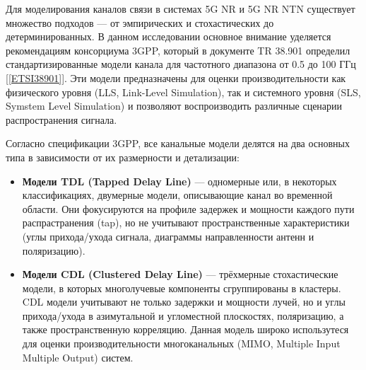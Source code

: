 %

Для моделирования каналов связи в системах 5G NR и 5G NR NTN существует множество подходов
— от эмпирических и стохастических до детерминированных.
В данном исследовании основное внимание уделяется рекомендациям консорциума 3GPP,
который в документе TR 38.901 определил стандартизированные модели канала для частотного диапазона 
от 0.5 до 100 ГГц [\ref{ETSI38901}]. Эти модели предназначены для оценки производительности как 
физического уровня (LLS, Link-Level Simulation), так и системного уровня (SLS, Symstem Level Simulation)
и позволяют воспроизводить различные сценарии распространения сигнала.

Согласно спецификации 3GPP, все канальные модели делятся на два основных типа в зависимости 
от их размерности и детализации:

\begin{itemize}
\item \textbf{Модели TDL (Tapped Delay Line)} 
    — одномерные или, в некоторых классификациях,
    двумерные модели, описывающие канал во временной области.
    Они фокусируются на профиле задержек и мощности каждого пути распрастранения (tap),
    но не учитывают пространственные характеристики (углы прихода/ухода сигнала,
    диаграммы направленности антенн и поляризацию).

\item \textbf{Модели CDL (Clustered Delay Line)}
    — трёхмерные стохастические модели,
    в которых многолучевые компоненты сгруппированы в кластеры.
    CDL модели учитывают не только задержки и мощности лучей,
    но и углы прихода/ухода в азимутальной и угломестной плоскостях,
    поляризацию, а также пространственную корреляцию. Данная модель широко использутеся 
    для оценки производительности многоканальных (MIMO, Multiple Input Multiple Output) систем.
\end{itemize}

